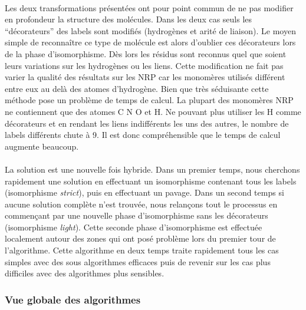 \documentclass[12pt,french,twoside]{report}
\begin{document}
\paragraph{}Les deux transformations présentées ont pour point commun de ne pas modifier en profondeur la structure des molécules.
Dans les deux cas seuls les ``décorateurs'' des labels sont modifiés (hydrogènes et arité de liaison).
Le moyen simple de reconnaître ce type de molécule est alors d'oublier ces décorateurs lors de la phase d'isomorphisme.
Dès lors les résidus sont reconnus quel que soient leurs variations sur les hydrogènes ou les liens.
Cette modification ne fait pas varier la qualité des résultats sur les NRP car les monomères utilisés différent entre eux au delà des atomes d'hydrogène.
Bien que très séduisante cette méthode pose un problème de temps de calcul.
La plupart des monomères NRP ne contiennent que des atomes C N O et H.
Ne pouvant plus utiliser les H comme décorateurs et en rendant les liens indifférents les uns des autres, le nombre de labels différents chute à 9.
Il est donc compréhensible que le temps de calcul augmente beaucoup.

\paragraph{}La solution est une nouvelle fois hybride.
Dans un premier temps, nous cherchons rapidement une solution en effectuant un
isomorphisme contenant tous les labels (isomorphisme {\em strict}), puis en effectuant un pavage.
Dans un second temps si aucune solution complète n'est trouvée, nous relançons tout le processus en commençant par
une nouvelle phase d'isomorphisme sans les décorateurs (isomorphisme {\em light}).
Cette seconde phase d'isomorphisme est effectuée localement autour des zones qui ont posé problème lors du premier tour de 
l'algorithme.
Cette algorithme en deux temps traite rapidement tous les cas simples avec des sous algorithmes efficaces puis
de revenir sur les cas plus difficiles avec des algorithmes plus sensibles.

\subsubsection{Vue globale des algorithmes}
\end{document}
